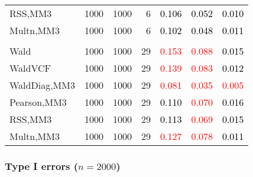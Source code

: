 \documentclass[
]{article}
\begin{document}
\begin{table}[H]
{\begin{tabular}[t]{lrrrrrr}
\hspace{1em}RSS,MM3 & 1000 & 1000 & 6 & \textcolor{black}{0.106} & \textcolor{black}{0.052} & \textcolor{black}{0.010}\\
\hspace{1em}Multn,MM3 & 1000 & 1000 & 6 & \textcolor{black}{0.102} & \textcolor{black}{0.048} & \textcolor{black}{0.011}\\
\addlinespace[0.3em]
\multicolumn{7}{l}{\textbf{3F 15V}}\\
\hspace{1em}Wald & 1000 & 1000 & 29 & \textcolor{red}{0.153} & \textcolor{red}{0.088} & \textcolor{black}{0.015}\\
\hspace{1em}WaldVCF & 1000 & 1000 & 29 & \textcolor{red}{0.139} & \textcolor{red}{0.083} & \textcolor{black}{0.012}\\
\hspace{1em}WaldDiag,MM3 & 1000 & 1000 & 29 & \textcolor{red}{0.081} & \textcolor{red}{0.035} & \textcolor{red}{0.005}\\
\hspace{1em}Pearson,MM3 & 1000 & 1000 & 29 & \textcolor{black}{0.110} & \textcolor{red}{0.070} & \textcolor{black}{0.016}\\
\hspace{1em}RSS,MM3 & 1000 & 1000 & 29 & \textcolor{black}{0.113} & \textcolor{red}{0.069} & \textcolor{black}{0.015}\\
\hspace{1em}Multn,MM3 & 1000 & 1000 & 29 & \textcolor{red}{0.127} & \textcolor{red}{0.078} & \textcolor{black}{0.011}\\
\bottomrule
\end{tabular}}
\endgroup{}
\end{table}

\hypertarget{type-i-errors-n2000-2}{%
\subsubsection{\texorpdfstring{Type I errors
(\(n=2000\))}{Type I errors (n=2000)}}\label{type-i-errors-n2000-2}}
\end{document}
